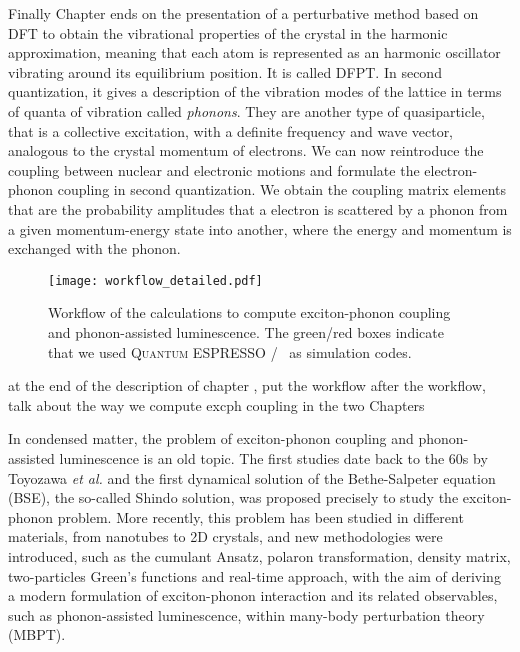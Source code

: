 Finally Chapter ends on the presentation of a perturbative method based on \acrshort{DFT} to obtain the vibrational properties of the crystal in the harmonic approximation, meaning that each atom is represented as an harmonic oscillator vibrating around its equilibrium position. It is called \acrfull{DFPT}. In second quantization, it gives a description of the vibration modes of the lattice in terms of quanta of vibration called \textit{phonons}. They are another type of quasiparticle, that is a collective excitation, with a definite frequency and wave vector, analogous to the crystal momentum of electrons. We can now reintroduce the coupling between nuclear and electronic motions and formulate the electron-phonon coupling in second quantization. We obtain the coupling matrix elements that are the probability amplitudes that a electron is scattered by a phonon from a given momentum-energy state into another, where the energy and momentum is exchanged with the phonon.  
\begin{figure}[h!b]
	\vspace{0.2cm}
	\setcapindent{2em}
	\centering
	\texttt{[image: workflow\_detailed.pdf]}
	\caption{Workflow of the calculations to compute exciton-phonon coupling and phonon-assisted luminescence. The green/red boxes indicate that we used \textsc{Quantum ESPRESSO} / \yambo~as simulation codes.}
	\label{fig:workflow}
\end{figure}

at the end of the description of chapter , put the workflow
after the workflow, talk about the way we compute excph coupling in the two Chapters

In condensed matter, the problem of exciton-phonon coupling and phonon-assisted luminescence is an old topic. The first studies date back to the 60s by Toyozawa \emph{et al.}\cite{toyozawa2003optical,toyozawa1964interband} and the first dynamical solution of the Bethe-Salpeter equation (BSE), the so-called Shindo solution, was proposed precisely to study the exciton-phonon problem.\cite{shindo1970effective}
More recently, this problem has been studied in different materials, from nanotubes\cite{perebeinos} to 2D crystals, and new methodologies were introduced, such as the cumulant Ansatz\cite{cudazzo2020first}, polaron transformation,\cite{feldtmann2009phonon} density matrix,\cite{brem2020phonon} two-particles Green's functions\cite{antonius2017theory} and real-time approach,\cite{paleari2022coupling} with the aim of deriving a modern formulation of exciton-phonon interaction and its related observables, such as phonon-assisted luminescence, within many-body perturbation theory (MBPT).

